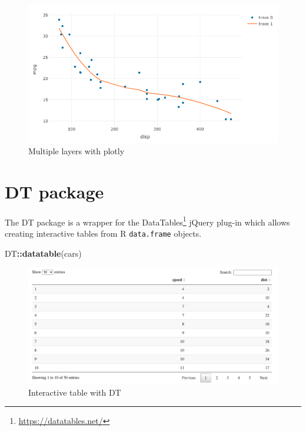 \documentclass[
  10pt,
]{krantz}
\makeatletter
\newenvironment{Shaded}{\begin{snugshade}}{\end{snugshade}}
\newcommand{\KeywordTok}[1]{\textcolor[rgb]{0.27,0.27,0.27}{\textbf{#1}}}
\newcommand{\NormalTok}[1]{#1}
\newcommand{\OperatorTok}[1]{\textcolor[rgb]{0.43,0.43,0.43}{\textbf{#1}}}
\renewcommand{\href}[2]{#2\footnote{\url{#1}}}
\newenvironment{kframe}{%
\medskip{}
\setlength{\fboxsep}{.8em}
 \def\at@end@of@kframe{}%
 \ifinner\ifhmode%
  \def\at@end@of@kframe{\end{minipage}}%
  \begin{minipage}{\columnwidth}%
 \fi\fi%
 \def\FrameCommand##1{\hskip\@totalleftmargin \hskip-\fboxsep
 \colorbox{shadecolor}{##1}\hskip-\fboxsep
     \hskip-\linewidth \hskip-\@totalleftmargin \hskip\columnwidth}%
 \MakeFramed {\advance\hsize-\width
   \@totalleftmargin\z@ \linewidth\hsize
   \@setminipage}}%
 {\par\unskip\endMakeFramed%
 \at@end@of@kframe}
\renewenvironment{Shaded}{\begin{kframe}}{\end{kframe}}
\makeatother
\begin{document}
\begin{figure}[H]

{\centering \includegraphics[width=1\linewidth]{images/03-plotly-multiple} 

}

\caption{Multiple layers with plotly}\label{fig:plotly-layers-diagram}
\end{figure}

\hypertarget{widgets-intro-dt}{%
\section{DT package}\label{widgets-intro-dt}}

The DT package \citep{R-DT} is a wrapper for the \href{https://datatables.net/}{DataTables} jQuery plug-in which allows creating interactive tables from R \texttt{data.frame} objects.

\begin{Shaded}
\begin{Highlighting}[]
\NormalTok{DT}\OperatorTok{::}\KeywordTok{datatable}\NormalTok{(cars)}
\end{Highlighting}
\end{Shaded}

\begin{figure}[H]

{\centering \includegraphics[width=1\linewidth]{images/03-DT} 

}

\caption{Interactive table with DT}\label{fig:plotly-dt-diagram}
\end{figure}
\end{document}
